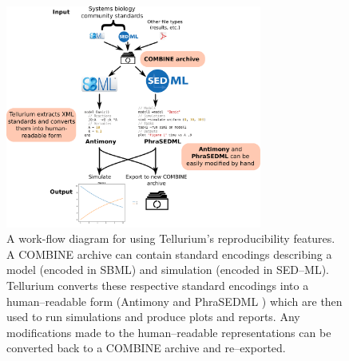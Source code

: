 \documentclass[10pt,letterpaper]{article}
\begin{document}
\begin{figure}
  \includegraphics[width=0.75\textwidth]{fig-workflow.pdf}
  \caption{A work-flow diagram for using Tellurium's reproducibility features. A COMBINE archive can contain standard encodings describing a model (encoded in SBML) and simulation (encoded in SED--ML). Tellurium converts these respective standard encodings into a human--readable form (Antimony \cite{smith2009antimony} and PhraSEDML \cite{choi2016phrased}) which are then used to run simulations and produce plots and reports. Any modifications made to the human--readable representations can be converted back to a COMBINE archive and re--exported.}
  \label{fig:workflow}
\end{figure}

\end{document}
